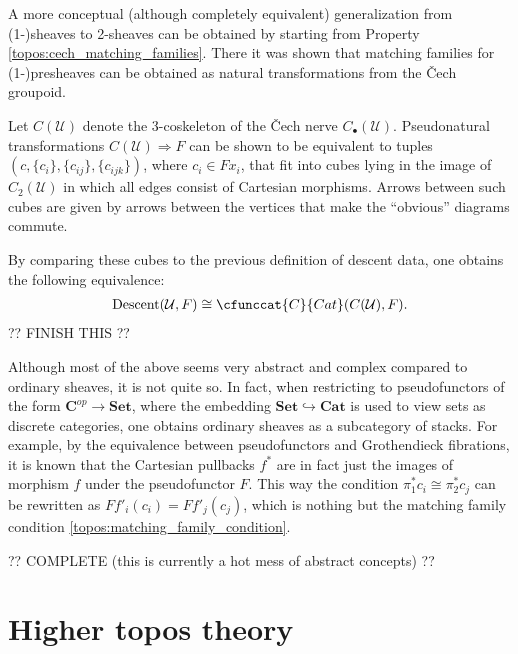     A more conceptual (although completely equivalent) generalization from (1-)sheaves to 2-sheaves can be obtained by starting from Property \ref{topos:cech_matching_families}. There it was shown that matching families for (1-)presheaves can be obtained as natural transformations from the \v{C}ech groupoid.
    \begin{property}
        Let $C(\mathcal{U})$ denote the 3-coskeleton of the \v{C}ech nerve $C_\bullet(\mathcal{U})$. Pseudonatural transformations $C(\mathcal{U})\Rightarrow F$ can be shown to be equivalent to tuples $(c,\{c_i\},\{c_{ij}\},\{c_{ijk}\})$, where $c_i\in Fx_i$, that fit into cubes lying in the image of $C_2(\mathcal{U})$ in which all edges consist of Cartesian morphisms. Arrows between such cubes are given by arrows between the vertices that make the ``obvious'' diagrams commute.

        By comparing these cubes to the previous definition of descent data, one obtains the following equivalence:
        \begin{gather}
            \mathrm{Descent}(\mathcal{U},F)\cong\cfunccat{C}{Cat}(C(\mathcal{U}),F).
        \end{gather}
        ?? FINISH THIS ??
    \end{property}

    \begin{remark}[1-sheaves]
        Although most of the above seems very abstract and complex compared to ordinary sheaves, it is not quite so. In fact, when restricting to pseudofunctors of the form $\mathbf{C}^{op}\rightarrow\mathbf{Set}$, where the embedding $\mathbf{Set}\hookrightarrow\mathbf{Cat}$ is used to view sets as discrete categories, one obtains ordinary sheaves as a subcategory of stacks. For example, by the equivalence between pseudofunctors and Grothendieck fibrations, it is known that the Cartesian pullbacks $f^*$ are in fact just the images of morphism $f$ under the pseudofunctor $F$. This way the condition $\pi_1^*c_i\cong\pi^*_2c_j$ can be rewritten as $Ff'_i(c_i)=Ff'_j(c_j)$, which is nothing but the matching family condition \ref{topos:matching_family_condition}.
    \end{remark}

    ?? COMPLETE (this is currently a hot mess of abstract concepts) ??

\section{Higher topos theory}


